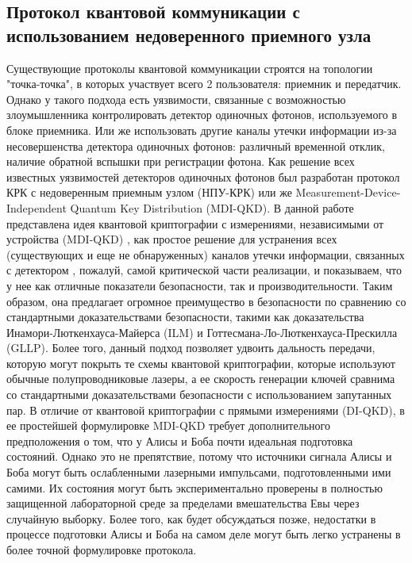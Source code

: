 \subsection{Протокол квантовой коммуникации с использованием недоверенного приемного узла} \label{sec:ch1/sect2/MDI QKD}
Существующие протоколы квантовой коммуникации строятся на топологии "точка-точка", в которых участвует всего 2 пользователя: приемник и передатчик. Однако у такого подхода есть уязвимости, связанные  с возможностью злоумышленника контролировать детектор одиночных фотонов, используемого в блоке приемника. Или же использовать другие каналы утечки информации из-за несовершенства детектора одиночных фотонов: различный временной отклик, наличие обратной вспышки при регистрации фотона. Как решение всех известных уязвимостей детекторов одиночных фотонов был разработан протокол КРК с недоверенным приемным узлом (НПУ-КРК) или же Measurement-Device-Independent Quantum Key Distribution (MDI-QKD). 
\newline В данной работе представлена идея квантовой криптографии с измерениями, независимыми от устройства (MDI-QKD) \cite{lo2012,liu2013}, как простое решение для устранения всех (существующих и еще не обнаруженных) каналов утечки информации, связанных с детектором \cite{zhao2008}, пожалуй, самой критической части реализации, и показываем, что у нее как отличные показатели безопасности, так и производительности. Таким образом, она предлагает огромное преимущество в безопасности по сравнению со стандартными доказательствами безопасности, такими как доказательства Инамори-Люткенхауса-Майерса (ILM) \cite{inamori2007} и Готтесмана-Ло-Люткенхауса-Прескилла (GLLP). \cite{gottesman2004} Более того, данный подход позволяет удвоить дальность передачи, которую могут покрыть те схемы квантовой криптографии, которые используют обычные полупроводниковые лазеры, а ее скорость генерации ключей сравнима со стандартными доказательствами безопасности с использованием запутанных пар. В отличие от квантовой криптографии с прямыми измерениями (DI-QKD), в ее простейшей формулировке MDI-QKD требует дополнительного предположения о том, что у Алисы и Боба почти идеальная подготовка состояний. Однако это не препятствие, потому что источники сигнала Алисы и Боба могут быть ослабленными лазерными импульсами, подготовленными ими самими. Их состояния могут быть экспериментально проверены в полностью защищенной лабораторной среде за пределами вмешательства Евы через случайную выборку. Более того, как будет обсуждаться позже, недостатки в процессе подготовки Алисы и Боба на самом деле могут быть легко устранены в более точной формулировке протокола.

